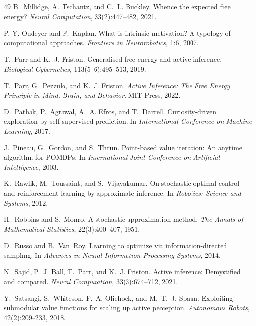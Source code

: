 \documentclass[runningheads]{llncs}
\begin{document}
\begin{thebibliography}{49}
B.~Millidge, A.~Tschantz, and C.~L. Buckley.
\newblock Whence the expected free energy?
\newblock \emph{Neural Computation}, 33(2):447--482, 2021.

P.-Y. Oudeyer and F.~Kaplan.
\newblock What is intrinsic motivation? {A} typology of computational approaches.
\newblock \emph{Frontiers in Neurorobotics}, 1:6, 2007.

T.~Parr and K.~J. Friston.
\newblock Generalised free energy and active inference.
\newblock \emph{Biological Cybernetics}, 113(5--6):495--513, 2019.

T.~Parr, G.~Pezzulo, and K.~J. Friston.
\newblock \emph{Active Inference: The Free Energy Principle in Mind, Brain, and Behavior}.
\newblock MIT Press, 2022.

D.~Pathak, P.~Agrawal, A.~A. Efros, and T.~Darrell.
\newblock Curiosity-driven exploration by self-supervised prediction.
\newblock In \emph{International Conference on Machine Learning}, 2017.

J.~Pineau, G.~Gordon, and S.~Thrun.
\newblock Point-based value iteration: An anytime algorithm for {POMDP}s.
\newblock In \emph{International Joint Conference on Artificial Intelligence}, 2003.

K.~Rawlik, M.~Toussaint, and S.~Vijayakumar.
\newblock On stochastic optimal control and reinforcement learning by approximate inference.
\newblock In \emph{Robotics: Science and Systems}, 2012.

H.~Robbins and S.~Monro.
\newblock A stochastic approximation method.
\newblock \emph{The Annals of Mathematical Statistics}, 22(3):400--407, 1951.

D.~Russo and B.~Van~Roy.
\newblock Learning to optimize via information-directed sampling.
\newblock In \emph{Advances in Neural Information Processing Systems}, 2014.

N.~Sajid, P.~J. Ball, T.~Parr, and K.~J. Friston.
\newblock Active inference: Demystified and compared.
\newblock \emph{Neural Computation}, 33(3):674--712, 2021.

Y.~Satsangi, S.~Whiteson, F.~A. Oliehoek, and M.~T.~J. Spaan.
\newblock Exploiting submodular value functions for scaling up active perception.
\newblock \emph{Autonomous Robots}, 42(2):209--233, 2018.


\end{thebibliography}
\end{document}
